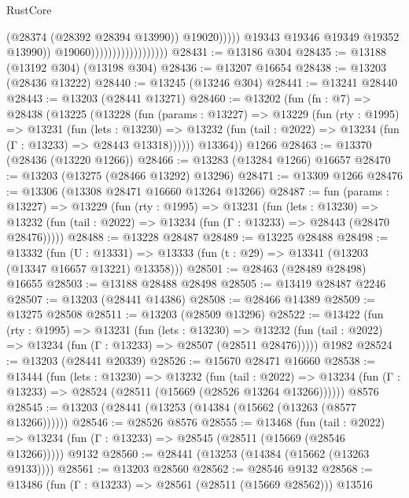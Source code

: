 \begin{lexlean}{RustCore}
\begin{coremodule}
                                                      (@28374 (@28392 @28394 @13990))
                                                      @19020)))))
                                            @19343
                                            @19346
                                            @19349
                                            @19352
                                            @13990))
                                        @19060))))))))))))))))))
@28431 := @13186 @304
@28435 := @13188 (@13192 @304) (@13198 @304)
@28436 := @13207 @16654
@28438 := @13203 (@28436 @13222)
@28440 := @13245 (@13246 @304)
@28441 := @13241 @28440
@28443 := @13203 (@28441 @13271)
@28460 := @13202
    (fun (fn : @7) =>
    @28438
      (@13225
        (@13228
          (fun (params : @13227) =>
          @13229
            (fun (rty : @1995) =>
            @13231
              (fun (lets : @13230) =>
              @13232 (fun (tail : @2022) => @13234 (fun (Γ : @13233) => @28443 @13318))))))
        @13364))
    @1266
@28463 := @13370 (@28436 (@13220 @1266))
@28466 := @13283 (@13284 @1266) @16657
@28470 := @13203 (@13275 (@28466 @13292) @13296)
@28471 := @13309 @1266
@28476 := @13306 (@13308 @28471 @16660 @13264 @13266)
@28487 := fun (params : @13227) =>
  @13229
    (fun (rty : @1995) =>
    @13231
      (fun (lets : @13230) =>
      @13232 (fun (tail : @2022) => @13234 (fun (Γ : @13233) => @28443 (@28470 @28476)))))
@28488 := @13228 @28487
@28489 := @13225 @28488
@28498 := @13332
    (fun (U : @13331) => @13333 (fun (t : @29) => @13341 (@13203 (@13347 @16657 @13221) @13358)))
@28501 := @28463 (@28489 @28498) @16655
@28503 := @13188 @28488 @28498
@28505 := @13419 @28487 @2246
@28507 := @13203 (@28441 @14386)
@28508 := @28466 @14389
@28509 := @13275 @28508
@28511 := @13203 (@28509 @13296)
@28522 := @13422
    (fun (rty : @1995) =>
    @13231
      (fun (lets : @13230) =>
      @13232 (fun (tail : @2022) => @13234 (fun (Γ : @13233) => @28507 (@28511 @28476)))))
    @1982
@28524 := @13203 (@28441 @20339)
@28526 := @15670 @28471 @16660
@28538 := @13444
    (fun (lets : @13230) =>
    @13232
      (fun (tail : @2022) =>
      @13234 (fun (Γ : @13233) => @28524 (@28511 (@15669 (@28526 @13264 @13266))))))
    @8576
@28545 := @13203 (@28441 (@13253 (@14384 (@15662 (@13263 (@8577 @13266))))))
@28546 := @28526 @8576
@28555 := @13468
    (fun (tail : @2022) => @13234 (fun (Γ : @13233) => @28545 (@28511 (@15669 (@28546 @13266)))))
    @9132
@28560 := @28441 (@13253 (@14384 (@15662 (@13263 @9133))))
@28561 := @13203 @28560
@28562 := @28546 @9132
@28568 := @13486 (fun (Γ : @13233) => @28561 (@28511 (@15669 @28562))) @13516

\end{coremodule}
\end{lexlean}
